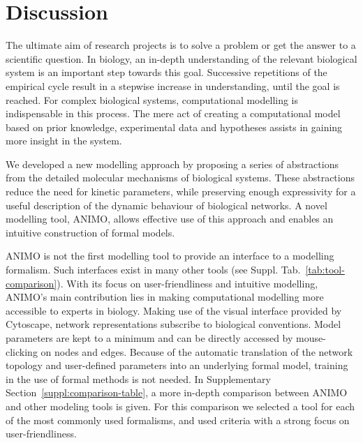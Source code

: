 \documentclass{bmcart}
\begin{document}
\section*{Discussion}
The ultimate aim of research projects is to solve a problem or get
the answer to a scientific question. In biology, an in-depth understanding of
the relevant biological system is an important step towards this goal. Successive 
repetitions of the empirical cycle result in a stepwise increase in understanding,
until the goal is reached. For complex biological systems, computational modelling is 
indispensable in this process. The mere act of creating 
a computational model based on prior knowledge, experimental data and hypotheses 
assists in gaining more insight in the system. 


We developed a new modelling approach by proposing a series of abstractions from the detailed 
molecular mechanisms of biological systems. These abstractions reduce the need for kinetic 
parameters, while preserving enough expressivity for a useful description of the dynamic 
behaviour of biological networks. A novel modelling tool, ANIMO, allows 
effective use of this approach and enables an intuitive construction of formal models.

ANIMO is not the first modelling tool to provide an interface to a
modelling formalism. Such interfaces exist in many other tools (see Suppl. Tab.~\ref{tab:tool-comparison}). With its
focus on user-friendliness and intuitive modelling, ANIMO's main contribution lies 
in making computational modelling more accessible to experts in biology.
Making use of the visual
interface provided by Cytoscape, network representations subscribe to biological conventions. 
Model parameters are kept to a minimum and can be directly accessed by mouse-clicking on 
nodes and edges. Because of the automatic translation of the network topology and 
user-defined parameters into an underlying formal model, training in the use of formal methods 
is not needed. In Supplementary Section~\ref{suppl:comparison-table}, a more in-depth
comparison between ANIMO and other modeling tools is given. For this comparison we selected a tool
for each of the most commonly used formalisms, and used criteria with a strong focus on 
user-friendliness.
\end{document}
